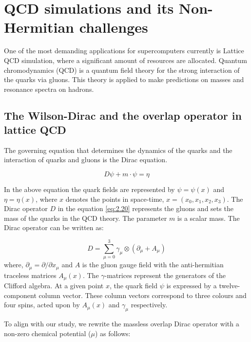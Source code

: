 \chapter{QCD simulations and its Non-Hermitian challenges}
\label{sec:QCD_sim_and_non_herm_challenges}

One of the most demanding applications for supercomputers currently is Lattice QCD simulation, where a significant amount of resources are allocated. Quantum chromodynamics (QCD) is a quantum field theory for the strong interaction of the quarks via gluons\cite{30}. This theory is applied to make predictions on masses and resonance spectra on hadrons\cite{29}.

\section{The Wilson-Dirac and the overlap operator in lattice QCD}
\label{sec:wil_dirac_overlap}

The governing equation that determines the dynamics of the quarks and the interaction of quarks and gluons is the Dirac equation.

\begin{equation}
    D\psi + m \cdot \psi = \eta
    \label{eq:2.20}
\end{equation}

In the above equation the quark fields are represented by $\psi = \psi(x)$ and $\eta = \eta(x)$, where $x$ denotes the points in space-time,
$x = (x_{0}, x_{1}, x_{2}, x_{3})$\cite{31}. The Dirac operator $D$ in the equation \ref{eq:2.20} represents the gluons and sets the mass of the quarks in the QCD theory. The parameter $m$ is a scalar mass. The Dirac operator can be written as:

\begin{equation}
    D = \sum_{\mu=0}^{3} \gamma_{\mu} \otimes (\partial_\mu + A_\mu)
    \label{eq:2.21}
\end{equation}
where, $\partial_\mu = \partial / \partial x_{\mu}$ and $A$ is the gluon gauge field with the anti-hermitian traceless matrices $A_{\mu}(x)$. The $\gamma$-matrices represent the generators of the Clifford algebra\cite{32}. At a given point $x$, the quark field $\psi$ is expressed by a twelve-component column vector. These column vectors correspond to three colours and four spins, acted upon by $A_{\mu}(x)$ and $\gamma_{\mu}$ respectively.

To align with our study, we rewrite the massless overlap Dirac operator with a non-zero chemical potential ($\mu$) as follows\cite{33}:

